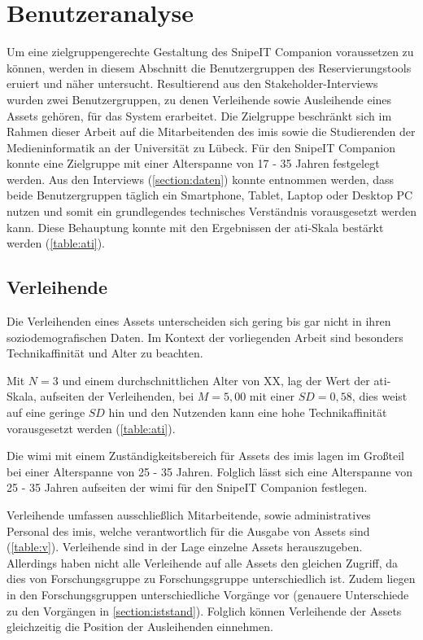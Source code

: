 \section{Benutzeranalyse}
\label{section:benutzer}
Um eine zielgruppengerechte Gestaltung des SnipeIT Companion voraussetzen zu können, werden in
diesem Abschnitt die Benutzergruppen des Reservierungstools eruiert und näher untersucht.
Resultierend aus den Stakeholder-Interviews wurden zwei Benutzergruppen, zu denen Verleihende sowie
Ausleihende eines Assets gehören, für das System erarbeitet. Die Zielgruppe beschränkt sich im
Rahmen dieser Arbeit auf die Mitarbeitenden des \ac{imis} sowie die Studierenden der
Medieninformatik an der Universität zu Lübeck. Für den SnipeIT Companion konnte eine Zielgruppe mit
einer Alterspanne von 17 - 35 Jahren festgelegt werden. Aus den Interviews (\ref{section:daten})
konnte entnommen werden, dass beide Benutzergruppen täglich ein Smartphone, Tablet, Laptop oder
Desktop PC nutzen und somit ein grundlegendes technisches Verständnis vorausgesetzt werden kann.
Diese Behauptung konnte mit den Ergebnissen der \ac{ati}-Skala bestärkt werden (\ref{table:ati}).


\subsection{Verleihende}
Die Verleihenden eines Assets unterscheiden sich gering bis gar nicht in ihren soziodemografischen
Daten. Im Kontext der vorliegenden Arbeit sind besonders Technikaffinität und Alter zu beachten.

Mit $N=3$ und einem durchschnittlichen Alter von XX, lag der Wert der \ac{ati}-Skala, aufseiten der
Verleihenden, bei $M=5,00$ mit einer $SD=0,58$, dies weist auf eine geringe $SD$ hin und den
Nutzenden kann eine hohe Technikaffinität vorausgesetzt werden  (\ref{table:ati}).

Die \ac{wimi} mit einem Zuständigkeitsbereich für Assets des \ac{imis} lagen im Großteil bei einer
Alterspanne von 25 - 35 Jahren. Folglich lässt sich eine Alterspanne von 25 - 35 Jahren aufseiten
der \ac{wimi} für den SnipeIT Companion festlegen.

Verleihende umfassen ausschließlich Mitarbeitende, sowie administratives Personal des \ac{imis},
welche verantwortlich für die Ausgabe von Assets sind (\ref{table:v}). Verleihende sind in der Lage
einzelne Assets herauszugeben. Allerdings haben nicht alle Verleihende auf alle Assets den gleichen
Zugriff, da dies von Forschungsgruppe zu Forschungsgruppe unterschiedlich ist. Zudem liegen in den
Forschungsgruppen unterschiedliche Vorgänge vor (genauere Unterschiede zu den Vorgängen in
\ref{section:iststand}). Folglich können Verleihende der Assets gleichzeitig die Position der
Ausleihenden einnehmen.

